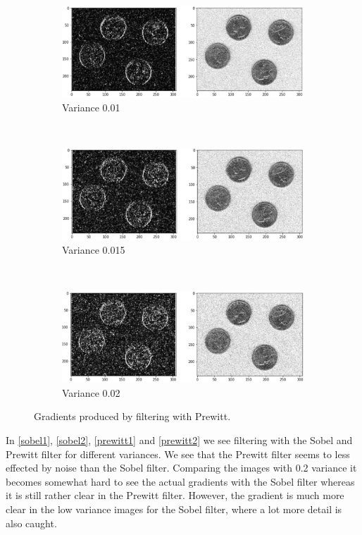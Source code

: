 \begin{figure}[H]
	\centering
		\begin{subfigure}[b]{\textwidth}
		\centering
		\includegraphics[width=\textwidth]{Materials/pvar01}
		\caption{Variance 0.01}
	\end{subfigure}
	\hfill
	\\
	\begin{subfigure}[b]{\textwidth}
		\centering
		\includegraphics[width=\textwidth]{Materials/pvar015}
		\caption{Variance 0.015}
	\end{subfigure}
	\hfill
	\\
	\begin{subfigure}[b]{\textwidth}
		\centering
		\includegraphics[width=\textwidth]{Materials/pvar02}
		\caption{Variance 0.02}
	\end{subfigure}
	\caption{Gradients produced by filtering with Prewitt.}
	\label{prewitt2}
\end{figure}
In \autoref{sobel1}, \autoref{sobel2}, \autoref{prewitt1} and \autoref{prewitt2} we see filtering with the Sobel and Prewitt filter for different variances. We see that the Prewitt filter seems to less effected by noise than the Sobel filter. Comparing the images with 0.2 variance it becomes somewhat hard to see the actual gradients with the Sobel filter whereas it is still rather clear in the Prewitt filter. However, the gradient is much more clear in the low variance images for the Sobel filter, where a lot more detail is also caught.\\
